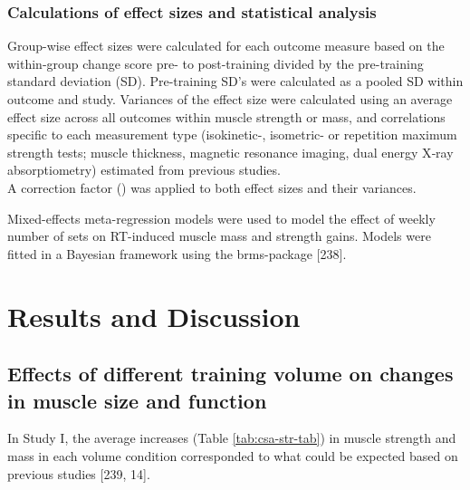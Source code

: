 \documentclass[twoside,10pt]{gihclass} %
\begin{document}
\hypertarget{calculations-of-effect-sizes-and-statistical-analysis}{%
\subsection{Calculations of effect sizes and statistical analysis}\label{calculations-of-effect-sizes-and-statistical-analysis}}

Group-wise effect sizes were calculated for each outcome measure based
on the within-group change score pre- to post-training divided by the
pre-training standard deviation (SD). Pre-training SD's were calculated
as a pooled SD within outcome and study. Variances of the effect size
were calculated using an average effect size across all outcomes within
muscle strength or mass, and correlations specific to each measurement
type (isokinetic-, isometric- or repetition maximum strength tests;
muscle thickness, magnetic resonance imaging, dual energy X‐ray
absorptiometry) estimated from previous studies.\\
A correction factor () was applied to both effect sizes and their
variances.

Mixed-effects meta-regression models were used to model the effect of
weekly number of sets on RT-induced muscle mass and strength gains.
Models were fitted in a Bayesian framework using the brms-package
{[}238{]}.

\hypertarget{results-and-discussion}{%
\chapter{Results and Discussion}\label{results-and-discussion}}

\hypertarget{effects-of-different-training-volume-on-changes-in-muscle-size-and-function}{%
\section{Effects of different training volume on changes in muscle size and function}\label{effects-of-different-training-volume-on-changes-in-muscle-size-and-function}}

In Study I, the average increases (Table \ref{tab:csa-str-tab}) in muscle strength and mass in each volume condition corresponded to what could be expected based on previous studies
{[}239, 14{]}.
\end{document}
